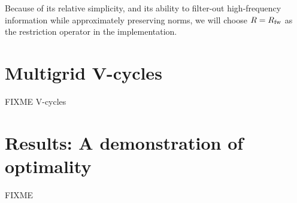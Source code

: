 \documentclass[letterpaper,final,12pt,reqno]{amsart}
\begin{document}
Because of its relative simplicity, and its ability to filter-out high-frequency information while approximately preserving norms, we will choose $R=R_{\text{fw}}$ as the restriction operator in the implementation.


\section{Multigrid V-cycles}

FIXME V-cycles


\section{Results: A demonstration of optimality}

FIXME


\small

\bigskip


\end{document}
